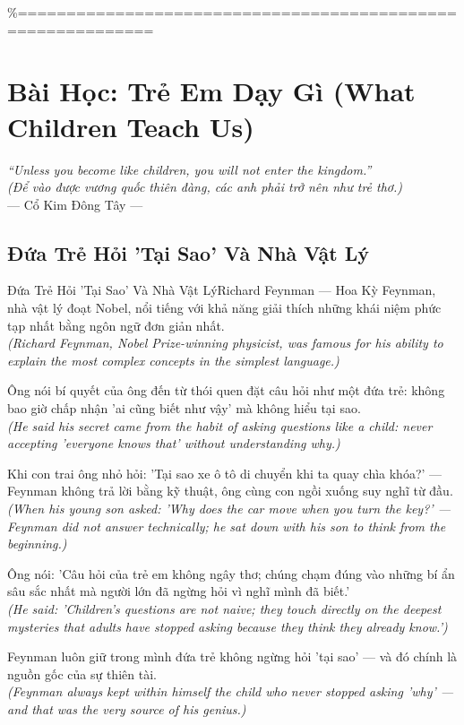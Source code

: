 \%============================================================
\chapter{Bài Học: Trẻ Em Dạy Gì (What Children Teach Us)}
\begin{center}
  \textit{\color{truyengold}``Unless you become like children, you will not enter the kingdom.''}\\[4pt]
  \textit{(Để vào được vương quốc thiên đàng, các anh phải trở nên như trẻ thơ.)}\\[4pt]
  \small\color{truyenblue}--- Cổ Kim Đông Tây ---
\end{center}
\ngancach

\section{Đứa Trẻ Hỏi 'Tại Sao' Và Nhà Vật Lý}
\begin{truyen}{Đứa Trẻ Hỏi 'Tại Sao' Và Nhà Vật Lý}{Richard Feynman --- Hoa Kỳ}
 Feynman, nhà vật lý đoạt Nobel, nổi tiếng với khả năng giải thích những khái niệm phức tạp nhất bằng ngôn ngữ đơn giản nhất.\\[4pt]
\textit{(Richard Feynman, Nobel Prize-winning physicist, was famous for his ability to explain the most complex concepts in the simplest language.)}

Ông nói bí quyết của ông đến từ thói quen đặt câu hỏi như một đứa trẻ: không bao giờ chấp nhận 'ai cũng biết như vậy' mà không hiểu tại sao.\\[4pt]
\textit{(He said his secret came from the habit of asking questions like a child: never accepting 'everyone knows that' without understanding why.)}

Khi con trai ông nhỏ hỏi: 'Tại sao xe ô tô di chuyển khi ta quay chìa khóa?' --- Feynman không trả lời bằng kỹ thuật, ông cùng con ngồi xuống suy nghĩ từ đầu.\\[4pt]
\textit{(When his young son asked: 'Why does the car move when you turn the key?' --- Feynman did not answer technically; he sat down with his son to think from the beginning.)}

Ông nói: 'Câu hỏi của trẻ em không ngây thơ; chúng chạm đúng vào những bí ẩn sâu sắc nhất mà người lớn đã ngừng hỏi vì nghĩ mình đã biết.'\\[4pt]
\textit{(He said: 'Children's questions are not naive; they touch directly on the deepest mysteries that adults have stopped asking because they think they already know.')}

Feynman luôn giữ trong mình đứa trẻ không ngừng hỏi 'tại sao' --- và đó chính là nguồn gốc của sự thiên tài.\\[4pt]
\textit{(Feynman always kept within himself the child who never stopped asking 'why' --- and that was the very source of his genius.)}

\end{truyen}
